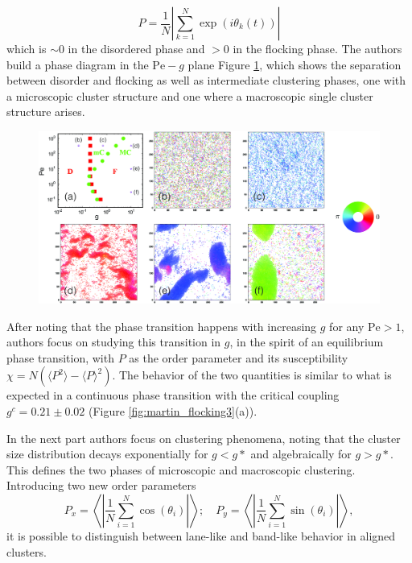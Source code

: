 \documentclass[../../master_thesis_np.tex]{subfiles}
\begin{document}
   	\[ P = \frac{1}{N}\left| \sum_{k=1}^{N} \exp{(i \theta_k(t))} \right|\]
  	 which is $\sim 0$ in the disordered phase and $> 0$ in the flocking phase. The authors build a phase diagram in the $\mathrm{Pe}-g$ plane Figure \ref{fig:martin_flocking1}, which shows the separation between disorder and flocking as well as intermediate clustering phases, one with a microscopic cluster structure and one where a macroscopic single cluster structure arises.
	
	\begin{figure}[h]
		\centering
		\includegraphics[width=\textwidth]{martin_phaseseparation.png}
		\caption{\parencite{martin-gomez_collective_2018}}
		\label{fig:martin_flocking1}
	\end{figure}
	
	After noting that the phase transition happens with increasing $g$ for any $\mathrm{Pe} > 1$, authors focus on studying this transition in $g$, in the  spirit of an equilibrium phase transition, with $P$ as the order parameter and its susceptibility $\chi = N(\langle P^2 \rangle - \langle P \rangle^2)$. The behavior of the two quantities is similar to what is expected in a continuous phase transition with the critical coupling $g^c = 0.21 \pm 0.02$ (Figure \ref{fig:martin_flocking3}(a)).
	
	In the next part authors focus on clustering phenomena, noting that the cluster size distribution decays exponentially for $g < g*$ and algebraically for $g > g*$. This defines the two phases of microscopic and macroscopic clustering.
	Introducing two new order parameters
	\[ P_x = \left\langle \left| \frac{1}{N} \sum_{i=1}^N \cos(\theta_i) \right| \right\rangle ; \quad
	P_y = \left\langle \left| \frac{1}{N} \sum_{i=1}^N \sin(\theta_i) \right| \right\rangle,
 \]
 it is possible to distinguish between lane-like and band-like behavior in aligned clusters.
 
\end{document}
